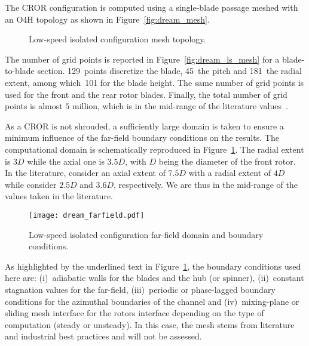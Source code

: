 
The CROR configuration is computed using
a single-blade passage meshed
with an O4H topology as shown in Figure~\ref{fig:dream_mesh}.
\begin{figure}[htp]
  \centering
  \caption{Low-speed isolated configuration mesh topology.}
\end{figure}
The number of grid points is reported in 
Figure~\ref{fig:dream_ls_mesh} for a blade-to-blade section. 
129~points discretize the blade, 45~the pitch and 181~the radial
extent, among which~101 for the blade height. 
The same number of grid points is used for the front
and the rear rotor blades. 
Finally, the total number of grid points is almost $5$ million, which
is in the mid-range of the literature 
values~\cite{Stuermer2008,Bechet2011,
Francois2013,Zachariadis2011,Peters2012}.

As a CROR is not shrouded, a sufficiently large
 domain is taken to ensure a minimum influence
of the far-field boundary conditions on the results.
The computational domain is schematically reproduced 
in Figure~\ref{fig:dream_farfield}.
The radial extent is $3D$ while the axial one is $3.5D$, with
$D$ being the diameter of the front rotor.
In the literature, 
\citet{Peters2012} consider an axial extent of $7.5D$
with a radial extent of $4D$ while \citet{Zachariadis2011}
consider $2.5D$ and $3.6D$, respectively. We are thus in 
the mid-range of the values taken in the literature.
\begin{figure}[htp]
  \centering
  \texttt{[image: dream\_farfield.pdf]}
  \caption{Low-speed isolated configuration far-field domain and boundary conditions.}
  \label{fig:dream_farfield}
\end{figure}
As highlighted by the underlined text in Figure~\ref{fig:dream_farfield},
the boundary conditions used here are: (i)~adiabatic walls
for the blades and the hub (or spinner), (ii)~constant
stagnation values for the far-field, (iii)~periodic
or phase-lagged boundary conditions 
for the azimuthal boundaries of the channel
and (iv)~mixing-plane or sliding mesh interface for the
rotors interface depending on the type of computation (steady or unsteady).
In this case,
the mesh stems from literature and industrial best
practices and will not be assessed.

